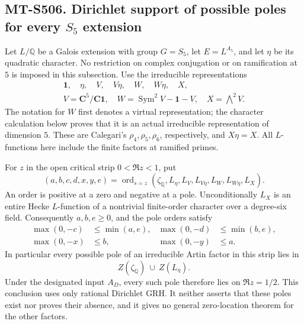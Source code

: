 \subsection*{MT-S506. Dirichlet support of possible poles for every $S_5$ extension}

Let $L/\mathbb Q$ be a Galois extension with group $G=S_5$,
let $E=L^{A_5}$, and let $\eta$ be its quadratic character.
No restriction on complex conjugation or on ramification at $5$
is imposed in this subsection.  Use the irreducible representations
\[
 \begin{gathered}
 \mathbf1,\quad\eta,\quad V,\quad V\eta,\quad W,\quad W\eta,\quad X,\\
 V=\mathbf C^5/\mathbf C\mathbf1,\quad
 W=\operatorname{Sym}^2V-\mathbf1-V,\quad X=\bigwedge^2V.
 \end{gathered}
 \tag{S506.1}
\]
The notation for $W$ first denotes a virtual representation;
the character calculation below proves that it is an actual
irreducible representation of dimension $5$.  These are
Calegari's $\rho_4,\rho_5,\rho_6$, respectively, and $X\eta=X$.
All $L$-functions here include the finite factors at ramified primes.

For $z$ in the open critical strip $0<\Re z<1$, put
\[
 (a,b,c,d,x,y,e)=\operatorname{ord}_{s=z}
 (\zeta_{\mathbb Q},L_\eta,L_V,L_{V\eta},L_W,L_{W\eta},L_X).
 \tag{S506.2}
\]
An order is positive at a zero and negative at a pole.
Unconditionally $L_X$ is an entire Hecke $L$-function of a
nontrivial finite-order character over a degree-six field.
Consequently $a,b,e\ge0$, and the pole orders satisfy
\[
 \begin{aligned}
 \max(0,-c)&\le\min(a,e),&
 \max(0,-d)&\le\min(b,e),\\
 \max(0,-x)&\le b,&
 \max(0,-y)&\le a.
 \end{aligned}
 \tag{S506.3}
\]
In particular every possible pole of an irreducible Artin factor
in this strip lies in
\[
          Z(\zeta_{\mathbb Q})\ \cup\ Z(L_\eta).
 \tag{S506.4}
\]
Under the designated input $A_D$, every such pole therefore lies
on $\Re z=1/2$.  This conclusion uses only rational Dirichlet GRH.
It neither asserts that these poles exist nor proves their absence,
and it gives no general zero-location theorem for the other factors.

